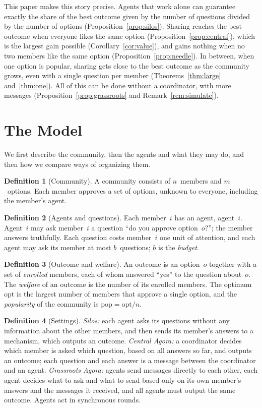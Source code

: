 \documentclass[11pt]{article}
\theoremstyle{definition}
\newtheorem{definition}{Definition}
\newcommand{\opt}{\mathrm{opt}}
\newcommand{\pop}{\mathrm{pop}}
\begin{document}
This paper makes this story precise.
Agents that work alone can guarantee exactly the share of the best outcome given by the number of questions divided by the number of options (Proposition~\ref{prop:silos}).
Sharing reaches the best outcome when everyone likes the same option (Proposition~\ref{prop:central}), which is the largest gain possible (Corollary~\ref{cor:value}), and gains nothing when no two members like the same option (Proposition~\ref{prop:needle}).
In between, when one option is popular, sharing gets close to the best outcome as the community grows, even with a single question per member (Theorems~\ref{thm:large} and~\ref{thm:one}).
All of this can be done without a coordinator, with more messages (Proposition~\ref{prop:grassroots} and Remark~\ref{rem:simulate}).

\section{The Model}

We first describe the community, then the agents and what they may do, and then how we compare ways of organizing them.

\begin{definition}[Community]
A community consists of $n$~members and $m$~options.
Each member approves a set of options, unknown to everyone, including the member's agent.
\end{definition}

\begin{definition}[Agents and questions]
Each member~$i$ has an agent, agent~$i$.
Agent~$i$ may ask member~$i$ a question ``do you approve option~$o$?''; the member answers truthfully.
Each question costs member~$i$ one unit of attention, and each agent may ask its member at most $b$~questions; $b$ is the \emph{budget}.
\end{definition}

\begin{definition}[Outcome and welfare]
An outcome is an option~$o$ together with a set of \emph{enrolled} members, each of whom answered ``yes'' to the question about~$o$.
The \emph{welfare} of an outcome is the number of its enrolled members.
The optimum $\opt$ is the largest number of members that approve a single option, and the \emph{popularity} of the community is $\pop = \opt / n$.
\end{definition}

\begin{definition}[Settings]
\emph{Silos:} each agent asks its questions without any information about the other members, and then sends its member's answers to a mechanism, which outputs an outcome.
\emph{Central Agora:} a coordinator decides which member is asked which question, based on all answers so far, and outputs an outcome; each question and each answer is a message between the coordinator and an agent.
\emph{Grassroots Agora:} agents send messages directly to each other, each agent decides what to ask and what to send based only on its own member's answers and the messages it received, and all agents must output the same outcome.
Agents act in synchronous rounds.
\end{definition}
\end{document}
